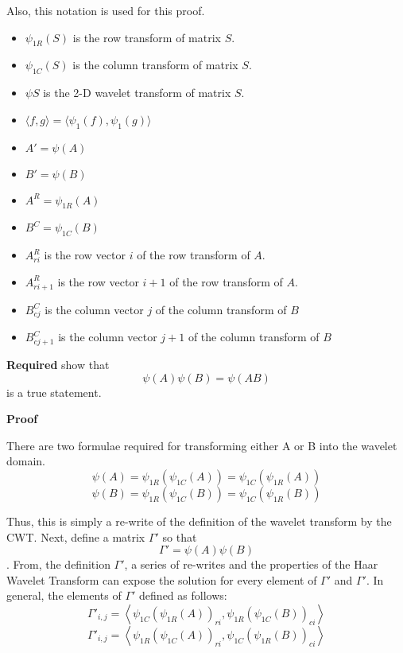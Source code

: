 Also, this notation is used for this proof.
\begin{itemize}
\item $\psi_{1R}(S)$ is the row transform of matrix $S$.
\item $\psi_{1C}(S)$ is the column transform of matrix $S$.
\item $\psi {S}$ is the 2-D wavelet transform of matrix $S$.
\item $\langle f,g \rangle = \langle \psi_1(f) , \psi_1(g) \rangle $
\item $A' = \psi(A)$
\item $B' = \psi(B)$
\item $A^R =\psi_{1R}(A) $
\item $B^C =\psi_{1C}(B) $ 
\item $A^R_{ri}$ is the row vector $i$ of the row transform of $A$.
\item $A^R_{ri+1}$ is the row vector $i+1$ of the row transform of $A$.
\item $B^C_{cj}$ is the column vector $j$ of the column transform of $B$
\item $B^C_{cj+1}$ is the column vector $j+1$ of the column transform of $B$
\end{itemize}

\textbf{Required} show that 
\[ \psi (A) \psi (B) = \psi (A B) \]
is a true statement. %


\textbf{Proof}

There are two formulae required for transforming either A or B into the wavelet domain.
\begin{equation}
\label{wavedefc4A}
 \psi (A) = \psi _{1R} ( \psi_{1C} (A)) = \psi _{1C} ( \psi_{1R} (A))
\end{equation}
\begin{equation}
\label{wavedefc4B}
\psi (B) = \psi _{1R} ( \psi_{1C} (B)) = \psi _{1C} ( \psi_{1R} (B))    
\end{equation}

Thus, this is simply a re-write of the definition of the wavelet transform by the CWT.   Next,  define a matrix $\Gamma'$  so that
\[\Gamma' = \psi (A) \psi (B) \].  From, the definition $\Gamma'$, a series of re-writes and the properties of the Haar Wavelet Transform can expose the solution for every element of $\Gamma'$ and $\Gamma'$.  In general, the elements of $\Gamma'$ defined as follows:
\begin{equation}
\label{wavecrossA}
\Gamma'_{i,j} =   \left\langle \psi_{1C} (\psi_{1R} (A)) _{ri} , \psi_{1R} (\psi_{1C} (B)) _{ci}  \right\rangle
\end{equation}
\begin{equation}
\label{wavecrossB}
\Gamma'_{i,j} =   \left\langle \psi_{1R} (\psi_{1C} (A)) _{ri} , \psi_{1C} (\psi_{1R} (B)) _{ci}  \right\rangle
\end{equation}

